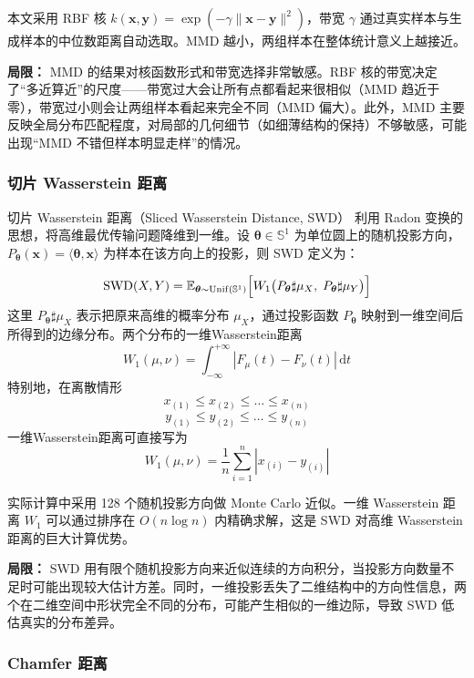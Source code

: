 \documentclass[UTF8,a4paper,12pt]{ctexart}
\newcommand{\E}{\mathbb{E}}
\begin{document}
本文采用 RBF 核 $k(\mathbf{x},\mathbf{y})=\exp(-\gamma\|\mathbf{x}-\mathbf{y}\|^2)$，带宽 $\gamma$ 通过真实样本与生成样本的中位数距离自动选取。MMD 越小，两组样本在整体统计意义上越接近。

\textbf{局限：} MMD 的结果对核函数形式和带宽选择非常敏感。RBF 核的带宽决定了“多近算近”的尺度——带宽过大会让所有点都看起来很相似（MMD 趋近于零），带宽过小则会让两组样本看起来完全不同（MMD 偏大）。此外，MMD 主要反映全局分布匹配程度，对局部的几何细节（如细薄结构的保持）不够敏感，可能出现“MMD 不错但样本明显走样”的情况。

\subsubsection{切片 Wasserstein 距离}

切片 Wasserstein 距离（Sliced Wasserstein Distance, SWD）\cite{rabin2011swd} 利用 Radon 变换的思想，将高维最优传输问题降维到一维。设 $\boldsymbol{\theta}\in\mathbb{S}^1$ 为单位圆上的随机投影方向，$P_{\boldsymbol{\theta}}(\mathbf{x})=\langle\boldsymbol{\theta},\mathbf{x}\rangle$ 为样本在该方向上的投影，则 SWD 定义为：

\begin{equation}
	\mathrm{SWD}(X,Y) = \E_{\boldsymbol{\theta}\sim\mathrm{Unif}(\mathbb{S}^1)}\Bigl[W_1\bigl(P_{\boldsymbol{\theta}}\sharp\mu_X,\;P_{\boldsymbol{\theta}}\sharp\mu_Y\bigr)\Bigr]
\end{equation}
这里 $P_{\boldsymbol{\theta}}\sharp\mu_X$ 表示把原来高维的概率分布 $\mu_X$，通过投影函数 $P_{\boldsymbol{\theta}}$ 映射到一维空间后所得到的边缘分布。两个分布的一维Wasserstein距离$$W_1(\mu, \nu) = \int_{-\infty}^{+\infty} |F_{\mu}(t) - F_{\nu}(t)| \,\mathrm{d}t$$特别地，在离散情形
$$x_{(1)} \le x_{(2)} \le \dots \le x_{(n)}$$$$y_{(1)} \le y_{(2)} \le \dots \le y_{(n)}$$
一维Wasserstein距离可直接写为$$W_1(\mu, \nu) = \frac{1}{n} \sum_{i=1}^n |x_{(i)} - y_{(i)}|$$

实际计算中采用 128 个随机投影方向做 Monte Carlo 近似。一维 Wasserstein 距离 $W_1$ 可以通过排序在 $O(n\log n)$ 内精确求解，这是 SWD 对高维 Wasserstein 距离的巨大计算优势。

\textbf{局限：} SWD 用有限个随机投影方向来近似连续的方向积分，当投影方向数量不足时可能出现较大估计方差。同时，一维投影丢失了二维结构中的方向性信息，两个在二维空间中形状完全不同的分布，可能产生相似的一维边际，导致 SWD 低估真实的分布差异。

\subsubsection{Chamfer 距离}
\end{document}
